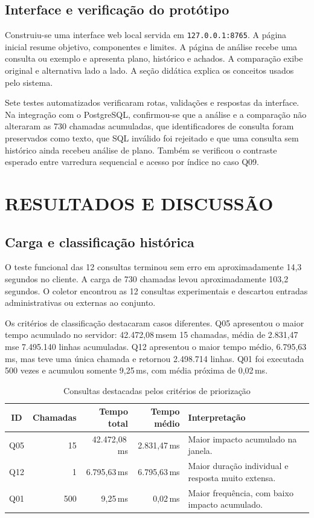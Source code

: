 \documentclass{UNESC}
\newcommand{\codigo}[1]{\texttt{#1}}
\newcommand{\ms}{\,ms}
\begin{document}
\subsection{Interface e verificação do protótipo}

Construiu-se uma interface web local servida em \codigo{127.0.0.1:8765}. A página inicial resume objetivo, componentes e limites. A página de análise recebe uma consulta ou exemplo e apresenta plano, histórico e achados. A comparação exibe original e alternativa lado a lado. A seção didática explica os conceitos usados pelo sistema.

Sete testes automatizados verificaram rotas, validações e respostas da interface. Na integração com o PostgreSQL, confirmou-se que a análise e a comparação não alteraram as 730 chamadas acumuladas, que identificadores de consulta foram preservados como texto, que SQL inválido foi rejeitado e que uma consulta sem histórico ainda recebeu análise de plano. Também se verificou o contraste esperado entre varredura sequencial e acesso por índice no caso Q09.

\section{RESULTADOS E DISCUSSÃO}

\subsection{Carga e classificação histórica}

O teste funcional das 12 consultas terminou sem erro em aproximadamente 14,3 segundos no cliente. A carga de 730 chamadas levou aproximadamente 103,2 segundos. O coletor encontrou as 12 consultas experimentais e descartou entradas administrativas ou externas ao conjunto.

Os critérios de classificação destacaram casos diferentes. Q05 apresentou o maior tempo acumulado no servidor: 42.472,08\ms em 15 chamadas, média de 2.831,47\ms e 7.495.140 linhas acumuladas. Q12 apresentou o maior tempo médio, 6.795,63\ms, mas teve uma única chamada e retornou 2.498.714 linhas. Q01 foi executada 500 vezes e acumulou somente 9,25\ms, com média próxima de 0,02\ms.

\begin{table}[H]
\centering
\caption{Consultas destacadas pelos critérios de priorização}
\label{tab:ranking}
\small
\begin{tabularx}{\textwidth}{c r r r Y}
\toprule
\textbf{ID} & \textbf{Chamadas} & \textbf{Tempo total} & \textbf{Tempo médio} & \textbf{Interpretação}\\
\midrule
Q05 & 15 & 42.472,08\ms & 2.831,47\ms & Maior impacto acumulado na janela.\\
Q12 & 1 & 6.795,63\ms & 6.795,63\ms & Maior duração individual e resposta muito extensa.\\
Q01 & 500 & 9,25\ms & 0,02\ms & Maior frequência, com baixo impacto acumulado.\\
\bottomrule
\end{tabularx}
\end{table}
\end{document}
